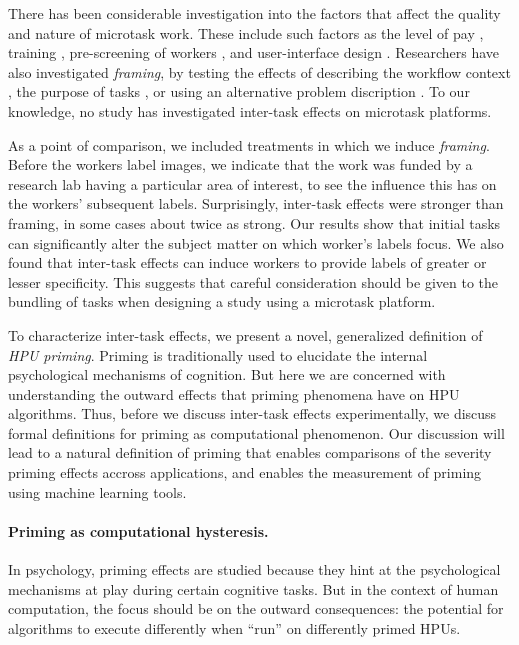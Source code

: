 \documentclass[12pt]{article}
\begin{document}
There has been considerable investigation into the factors that affect the 
quality and nature of microtask work.  These include such factors as the 
level of 
pay \cite{kazai2013analysis}, training \cite{le2010ensuring}, pre-screening of 
workers \cite{paolacci2010running}, and user-interface design 
\cite{Finnerty2013}.  Researchers have also investigated \textit{framing}, 
by testing the effects of describing the workflow context 
\cite{Kinnaird2012281}, the purpose of tasks 
\cite{chandler2013breaking}, or using an alternative problem discription
\cite{thibodeau2013natural}.  To our knowledge, no study has investigated 
inter-task effects on microtask platforms.

As a point of comparison, we included treatments in which we induce 
\textit{framing}.
Before the workers label images, we indicate that the work 
was funded by a research lab having a particular area of interest, to see the 
influence this has on the workers’ subsequent labels. 
Surprisingly, inter-task effects were stronger than framing, in some cases 
about twice as strong. 
Our results show that initial tasks can significantly alter the subject 
matter on which worker's labels focus. We also found that inter-task 
effects can induce workers to provide labels of greater or lesser specificity. 
This suggests that careful consideration should be given to the bundling of 
tasks when designing a study using a microtask platform.

To characterize inter-task effects, we present a novel, generalized definition 
of \textit{HPU priming}. Priming is traditionally used to elucidate the
internal psychological mechanisms of cognition.  But here we are concerned with
understanding the outward effects that priming phenomena have on HPU 
algorithms. Thus, before we discuss inter-task effects experimentally, we 
discuss formal definitions for priming as computational phenomenon.  Our
discussion will lead to a natural definition of priming that enables 
comparisons of the severity priming effects accross applications, and enables
the measurement of priming using machine learning tools.

\paragraph*{Priming as computational hysteresis.}
In psychology, priming effects are studied because they hint at the 
psychological mechanisms at play during certain cognitive tasks. But in the 
context of human computation, the focus should be on the outward consequences: 
the potential for algorithms to execute differently when ``run'' on differently
primed HPUs.
\end{document}
